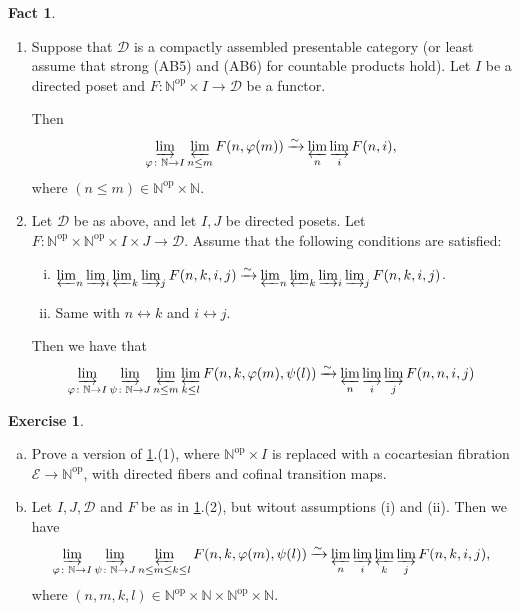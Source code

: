 \documentclass[draft]{amsart}
\newcommand{\NN}{\mathbb{N}}
\newcommand{\cat}[1]{\mathcal{#1}}
\newcommand{\op}{\mathrm{op}}
\newcommand{\isoto}{\mathbin{\xrightarrow{\sim}}}
\theoremstyle{definition}
\newtheorem{fact}[thm]{Fact}
\newtheorem{exercise}[thm]{Exercise}
\begin{document}
\begin{fact}\label{Efimov:fact}
\begin{enumerate}[(1)]
\item Suppose that $\cat D$ is a compactly assembled presentable category (or least assume that strong (AB5) and (AB6) for countable products hold). Let $I$ be a directed poset and $F\colon \NN^\op \times I \to \cat D$ be a functor.

Then 
\[
\varinjlim_{\varphi\colon \NN\to I} \varprojlim_{n\le m} F(n, \varphi(m)) \isoto  \varprojlim_n \varinjlim_i F(n,i),
\]
where $(n\le m) \in \NN^{\op}\times \NN$.

\item Let $\cat D$ be as above, and let $I, J$ be directed posets. Let $F\colon \NN^\op \times \NN^\op \times I\times J \to \cat D$. Assume that the following conditions are satisfied:
\begin{enumerate}[(i)]
\item $\varprojlim_n \varinjlim_i \varprojlim_k \varinjlim_j F(n,k,i,j) \isoto \varprojlim_n \varprojlim_k \varinjlim_i \varinjlim_j F(n,k,i,j)$.

\item Same with $n\leftrightarrow k$ and $i\leftrightarrow j$.
\end{enumerate}
Then we have that
\[
\varinjlim_{\varphi\colon \NN\to I} \varinjlim_{\psi\colon \NN\to J} \varprojlim_{n\le m} \varprojlim_{k\le l} F(n,k,\varphi(m), \psi(l)) \isoto
\varprojlim_n \varinjlim_i \varinjlim_j F(n,n,i,j)
\]
\end{enumerate}
\end{fact}

\begin{exercise}
\begin{enumerate}[(a)]
\item Prove a version of \cref{Efimov:fact}.(1), where $\NN^\op \times I$ is replaced with a cocartesian fibration $\cat E \to \NN^\op$, with directed fibers and cofinal transition maps.

\item Let $I, J, \cat D$ and $F$ be as in \cref{Efimov:fact}.(2), but witout assumptions (i) and (ii). Then we have
\[
\varinjlim_{\varphi\colon \NN\to I} \varinjlim_{\psi\colon \NN\to J} \varprojlim_{n\le m\le k\le l} F(n,k, \varphi(m), \psi(l))
\isoto
\varprojlim_n \varinjlim_i \varprojlim_k \varinjlim_j F(n,k,i,j),
\]
where $(n,m,k,l) \in \NN^\op \times \NN \times \NN^\op \times \NN$.
\end{enumerate}
\end{exercise}
\end{document}
